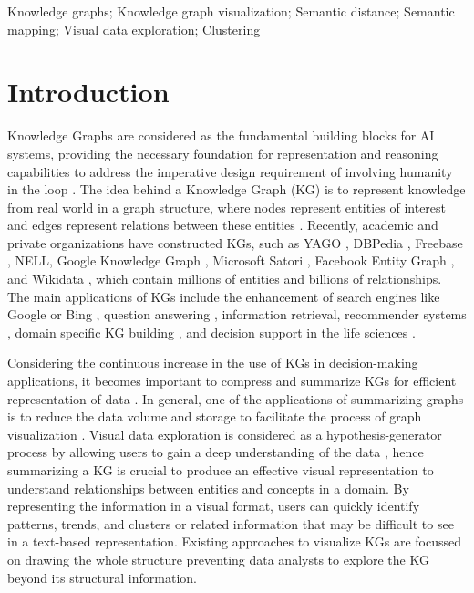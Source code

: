 \documentclass{ieeeaccess}
\begin{document}
\begin{keywords}
Knowledge graphs; Knowledge graph visualization; Semantic distance; Semantic mapping; Visual data exploration; Clustering
\end{keywords}

\titlepgskip=-15pt

\maketitle

\section{Introduction}
\label{sec:introduction}
Knowledge Graphs are considered as the fundamental 
building blocks for AI systems, providing the necessary
foundation for representation and reasoning capabilities
to address the imperative design requirement of involving
humanity in the loop \cite{Purohit2020}. The idea behind
a Knowledge Graph (KG) is to represent knowledge from
real world in a graph structure, where nodes represent 
entities of interest and edges represent relations between 
these entities \cite{Hogan21}. Recently, academic and 
private organizations have constructed KGs, such as  YAGO 
\cite{suchanek2007yago}, DBPedia \cite{auer2007dbpedia}, 
Freebase \cite{Freebase08}, NELL\cite{NELL10}, Google 
Knowledge Graph \cite{GoogleKG12}, Microsoft Satori 
\cite{Satori13}, Facebook Entity Graph \cite{Facebook13}, 
and Wikidata \cite{Wikidata14}, which contain millions of entities and billions of relationships. The main applications
of KGs include the enhancement of search engines like 
Google \cite{GoogleKG12} or Bing \cite{Satori13}, question 
answering \cite{Chen2022}, information retrieval, 
recommender systems \cite{Lin2022, Haotian2022}, domain
specific KG building \cite{Zhang2022, Borrego2022, Guan2022},
and decision support in the life sciences
\cite{Zou_2020,Belleau08,Ruttenberg09,Momtchev09}.

Considering the continuous increase in the use of 
KGs in decision-making applications, it becomes 
important to compress and summarize KGs for efficient
representation of data \cite{gunaratna2017}. In 
general, one of the applications of summarizing
graphs is to reduce the data volume and storage
to facilitate the process of graph visualization
\cite{liu2018graph}. Visual data exploration is
considered as a hypothesis-generator process by
allowing users to gain a deep understanding of 
the data \cite{keim2001visual}, hence summarizing
a KG is crucial to produce an effective visual 
representation to understand relationships 
between entities and concepts in a domain. By
representing the information in a visual format, 
users can quickly identify patterns, trends, and
clusters or related information that may be 
difficult to see in a text-based representation. 
Existing approaches to visualize KGs are focussed on 
drawing the whole structure \cite{gomez2018visualizing} 
preventing data analysts to explore the KG beyond its 
structural information.
\end{document}
